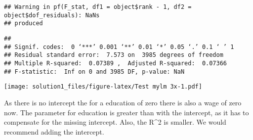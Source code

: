 \documentclass[
]{article}
\begin{document}
\begin{verbatim}
## Warning in pf(F_stat, df1 = object$rank - 1, df2 = object$dof_residuals): NaNs
## produced
\end{verbatim}

\begin{verbatim}
## 
## Signif. codes:  0 ‘***’ 0.001 ‘**’ 0.01 ‘*’ 0.05 ‘.’ 0.1 ‘ ’ 1
## Residual standard error:  7.573 on  3985 degrees of freedom 
## Multiple R-squared:  0.07389 ,  Adjusted R-squared:  0.07366 
## F-statistic:  Inf on 0 and 3985 DF, p-value: NaN
\end{verbatim}

\texttt{[image: solution1\_files/figure-latex/Test mylm 3x-1.pdf]}

As there is no intercept the for a education of zero there is also a
wage of zero now. The parameter for education is greater than with the
intercept, as it has to compensate for the missing intercept. Also, the
R\^{}2 is smaller. We would recommend adding the intercept.
\end{document}
